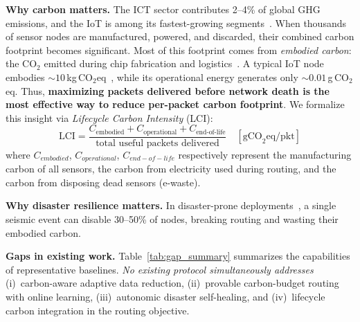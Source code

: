 \documentclass[12pt, onecolumn, journal]{IEEEtran}
\begin{document}
\textbf{Why carbon matters.} The ICT sector contributes 2--4\% of global GHG emissions, and the IoT is among its fastest-growing segments~\cite{freitag2021ict, huynh2025carbon_dt}. When thousands of sensor nodes are manufactured, powered, and discarded, their combined carbon footprint becomes significant. Most of this footprint comes from \emph{embodied carbon}: the CO$_2$ emitted during chip fabrication and logistics~\cite{pirson2021embodied}. A typical IoT node embodies ${\sim}10$\,kg\,CO$_2$eq~\cite{pirson2021embodied}, while its operational energy generates only ${\sim}0.01$\,g\,CO$_2$eq. Thus, \textbf{maximizing packets delivered before network death is the most effective way to reduce per-packet carbon footprint}. We formalize this insight via \emph{Lifecycle Carbon Intensity} (LCI):
\begin{equation}
    \text{LCI} = \frac{C_{\text{embodied}} + C_{\text{operational}} + C_{\text{end-of-life}}}{\text{total useful packets delivered}} \quad [\text{gCO}_2\text{eq/pkt}]
    \label{eq:lci}
\end{equation}
where $C_{embodied}$, $C_{operational}$, $C_{end-of-life}$ respectively represent the manufacturing carbon of all sensors, the carbon from electricity used during routing, and the carbon from disposing dead sensors (e-waste).

\textbf{Why disaster resilience matters.}
In disaster-prone deployments~\cite{erdelj2017disaster, karaman2025disaster_survey}, a single seismic event can disable 30--50\% of nodes, breaking routing and wasting their embodied carbon.

\textbf{Gaps in existing work.}
Table~\ref{tab:gap_summary} summarizes the capabilities of representative baselines.
\emph{No existing protocol simultaneously addresses} (i)~carbon-aware adaptive data reduction, (ii)~provable carbon-budget routing with online learning, (iii)~autonomic disaster self-healing, and (iv)~lifecycle carbon integration in the routing objective.
\end{document}

